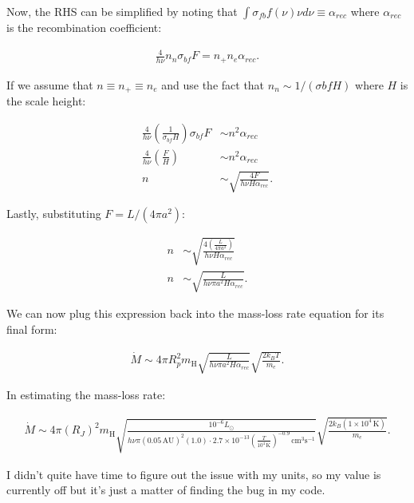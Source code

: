 \documentclass[12pt]{article}
\begin{document}
Now, the RHS can be simplified by noting that $\int\sigma_{fb}f(\nu)\nu d\nu \equiv \alpha_{rec}$ where $\alpha_{rec}$ is the recombination coefficient:

\begin{align*}
\frac{4}{h\nu}n_n\sigma_{bf}F = n_+n_e\alpha_{rec}.
\end{align*}

If we assume that $n \equiv n_+ \equiv n_e$ and use the fact that $n_n \sim 1/(\sigma{bf}H)$ where $H$ is the scale height:

\begin{equation*}
\begin{split}
\frac{4}{h\nu}\left(\frac{1}{\sigma_{bf}H}\right)\sigma_{bf}F &\sim n^2\alpha_{rec}\\
\frac{4}{h\nu}\left(\frac{F}{H}\right) &\sim n^2\alpha_{rec}\\
n &\sim \sqrt{\frac{4F}{h\nu H\alpha_{rec}}}.
\end{split}
\end{equation*}

Lastly, substituting $F = L/(4\pi a^2)$:

\begin{equation*}
\begin{split}
n &\sim \sqrt{\frac{4\left(\frac{L}{4\pi a^2}\right)}{h\nu H\alpha_{rec}}}\\
n &\sim \sqrt{\frac{L}{h\nu\pi a^2 H\alpha_{rec}}}.
\end{split}
\end{equation*}

We can now plug this expression back into the mass-loss rate equation for its final form:

\begin{align*}
\dot{M} \sim 4\pi R_p^2m_\mathrm{H}\sqrt{\frac{L}{h\nu\pi a^2 H\alpha_{rec}}}\sqrt{\frac{2k_BT}{m_e}}.
\end{align*}

In estimating the mass-loss rate:

\begin{align*}
\dot{M} \sim 4\pi (R_J)^2m_\mathrm{H}\sqrt{\frac{10^{-6}L_\odot}{h\nu\pi (0.05\,\mathrm{AU})^2 (1.0) \cdot 2.7\times10^{-13}\left(\frac{T}{10^4\,\mathrm{K}}\right)^{-0.9}\,\mathrm{cm^3s^{-1}}}}\sqrt{\frac{2k_B(1\times10^4\,\mathrm{K})}{m_e}}.
\end{align*}

I didn't quite have time to figure out the issue with my units, so my value is currently off but it's just a matter of finding the bug in my code.
\end{document}
